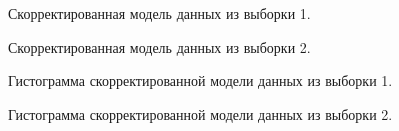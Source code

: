 \begin{figure}[H]
	\caption{Скорректированная модель данных из выборки 1.}
	\label{ris:hist2}
\end{figure}

\begin{figure}[H]
	\caption{Скорректированная модель данных из выборки 2.}
	\label{ris:hist2}
\end{figure}

\begin{figure}[H]
	\caption{Гистограмма скорректированной модели данных из выборки 1.}
	\label{ris:hist2}
\end{figure}

\begin{figure}[H]
	\caption{Гистограмма скорректированной модели данных из выборки 2.}
	\label{ris:hist2}
\end{figure}

